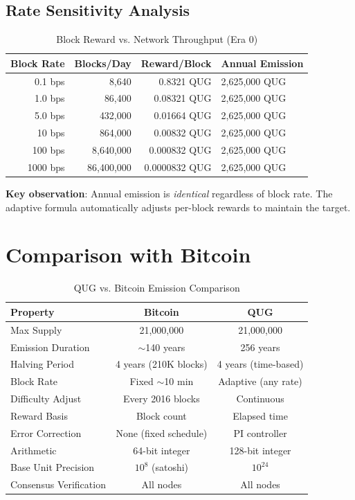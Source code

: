 \documentclass[11pt,a4paper]{article}
\begin{document}
\subsection{Rate Sensitivity Analysis}

\begin{table}[H]
\centering
\caption{Block Reward vs. Network Throughput (Era 0)}
\label{tab:rate}
\begin{tabular}{@{}rrrl@{}}
\toprule
\textbf{Block Rate} & \textbf{Blocks/Day} & \textbf{Reward/Block} & \textbf{Annual Emission} \\
\midrule
0.1 bps & 8,640      & 0.8321 QUG    & 2,625,000 QUG \\
1.0 bps & 86,400     & 0.08321 QUG   & 2,625,000 QUG \\
5.0 bps & 432,000    & 0.01664 QUG   & 2,625,000 QUG \\
10 bps  & 864,000    & 0.00832 QUG   & 2,625,000 QUG \\
100 bps & 8,640,000  & 0.000832 QUG  & 2,625,000 QUG \\
1000 bps & 86,400,000 & 0.0000832 QUG & 2,625,000 QUG \\
\bottomrule
\end{tabular}
\end{table}

\textbf{Key observation}: Annual emission is \emph{identical} regardless of block rate. The adaptive formula automatically adjusts per-block rewards to maintain the target.

\section{Comparison with Bitcoin}

\begin{table}[H]
\centering
\caption{QUG vs. Bitcoin Emission Comparison}
\begin{tabular}{@{}lcc@{}}
\toprule
\textbf{Property} & \textbf{Bitcoin} & \textbf{QUG} \\
\midrule
Max Supply & 21,000,000 & 21,000,000 \\
Emission Duration & $\sim$140 years & 256 years \\
Halving Period & 4 years (210K blocks) & 4 years (time-based) \\
Block Rate & Fixed $\sim$10 min & Adaptive (any rate) \\
Difficulty Adjust & Every 2016 blocks & Continuous \\
Reward Basis & Block count & Elapsed time \\
Error Correction & None (fixed schedule) & PI controller \\
Arithmetic & 64-bit integer & 128-bit integer \\
Base Unit Precision & $10^{8}$ (satoshi) & $10^{24}$ \\
Consensus Verification & All nodes & All nodes \\
\bottomrule
\end{tabular}
\end{table}
\end{document}
